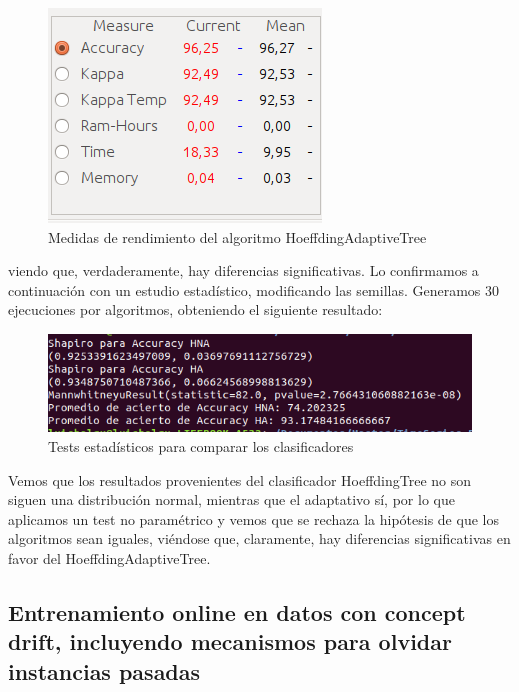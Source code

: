 \begin{figure}[H] %
	\centering
	\includegraphics[scale=0.4]{cd4.png}  %
	\caption{Medidas de rendimiento del algoritmo HoeffdingAdaptiveTree} 
	\label{fig:cd4}
\end{figure}

viendo que, verdaderamente, hay diferencias significativas. Lo confirmamos a continuación con un estudio estadístico, modificando las semillas. Generamos 30 ejecuciones por algoritmos, obteniendo el siguiente resultado:

\begin{figure}[H] %
	\centering
	\includegraphics[scale=0.4]{cd5.png}  %
	\caption{Tests estadísticos para comparar los clasificadores} 
	\label{fig:cd5}
\end{figure}

Vemos que los resultados provenientes del clasificador HoeffdingTree no son siguen una distribución normal, mientras que el adaptativo sí, por lo que aplicamos un test no paramétrico y vemos que se rechaza la hipótesis de que los algoritmos sean iguales, viéndose que, claramente, hay diferencias significativas en favor del HoeffdingAdaptiveTree.

\subsection{Entrenamiento online en datos con concept drift, incluyendo mecanismos para olvidar instancias pasadas}

